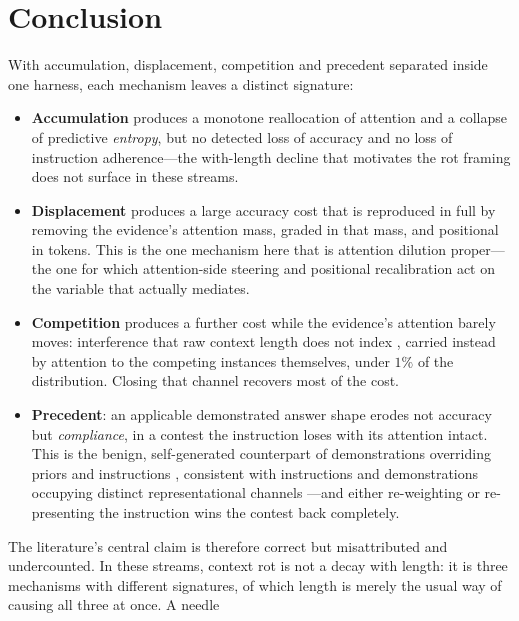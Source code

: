\documentclass{article}
\begin{document}
\section{Conclusion}

With accumulation, displacement, competition and precedent separated inside one harness, each
mechanism leaves a distinct signature:
\begin{itemize}[leftmargin=1.35em,itemsep=1pt,topsep=2pt]
\item \textbf{Accumulation} produces a monotone reallocation of attention and a collapse of
  predictive \emph{entropy}, but no detected loss of accuracy and no loss of instruction
  adherence---the with-length decline that motivates the rot framing
  \citep{liu2023lost,hong2025contextrot,laban2025lost} does not surface in these streams.
\item \textbf{Displacement} produces a large accuracy cost that is reproduced in full by
  removing the evidence's attention mass, graded in that mass, and positional in tokens. This
  is the one mechanism here that is attention dilution proper---the one for which attention-side
  steering and positional recalibration \citep{zhang2023pasta,hsieh2024foundinmiddle} act on
  the variable that actually mediates.
\item \textbf{Competition} produces a further cost while the evidence's attention barely
  moves: interference that raw context length does not index
  \citep[cf.][]{wang2025unabletoforget}, carried instead by attention to the competing
  instances themselves, under $1\%$ of the distribution. Closing that channel recovers most of
  the cost.
\item \textbf{Precedent}: an applicable demonstrated answer shape erodes not accuracy but
  \emph{compliance}, in a contest the instruction loses with its attention intact. This is the
  benign, self-generated counterpart of demonstrations overriding priors and instructions
  \citep{wei2023icldifferently,anil2024manyshot,camassa2026instructioninduction}, consistent
  with instructions and demonstrations occupying distinct representational channels
  \citep{davidson2025taskrepresentation,hendel2023taskvectors,todd2024functionvectors}---and
  either re-weighting or re-presenting the instruction wins the contest back completely.
\end{itemize}
The literature's central claim is therefore correct but misattributed and undercounted. In
these streams, context rot is not a decay with length: it is three mechanisms with different
signatures, of which length is merely the usual way of causing all three at once. A needle
\end{document}
